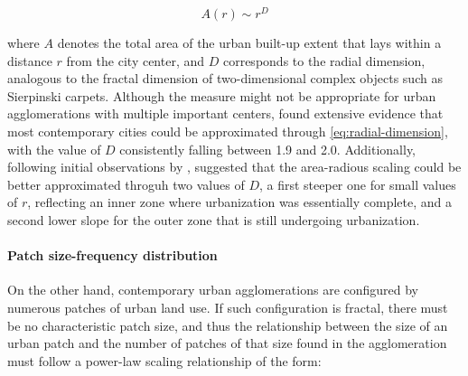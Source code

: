\documentclass[10pt,letterpaper]{article}
\begin{document}
\begin{equation}
  \label{eq:radial-dimension}
  A(r) \sim r^D
\end{equation}

where $A$ denotes the total area of the urban built-up extent that lays within a distance $r$ from the city center, and $D$ corresponds to the radial dimension, analogous to the fractal dimension of two-dimensional complex objects such as Sierpinski carpets.
Although the measure might not be appropriate for urban agglomerations with multiple important centers, \cite{frankhauser1994fractalite} found extensive evidence that most contemporary cities could be approximated through \autoref{eq:radial-dimension}, with the value of $D$ consistently falling between 1.9 and 2.0.
Additionally, following initial observations by \cite{frankhauser1990aspects}, \cite{white1993cellular} suggested that the area-radious scaling could be better approximated throguh two values of $D$, a first steeper one for small values of $r$, reflecting an inner zone where urbanization was essentially complete, and a second lower slope for the outer zone that is still undergoing urbanization.


\paragraph*{Patch size-frequency distribution}
On the other hand, contemporary urban agglomerations are configured by numerous patches of urban land use.
If such configuration is fractal, there must be no characteristic patch size, and thus the relationship between the size of an urban patch and the number of patches of that size found in the agglomeration must follow a power-law scaling relationship of the form:
\end{document}

